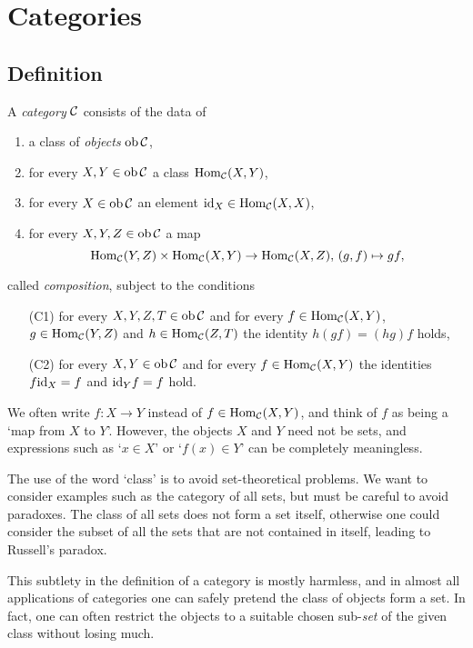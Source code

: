 
\chapter{Categories}
\label{chapter:categories}


\section{Definition}

\begin{definition}A \emph{category} ${\mathcal{C}}$ consists of the data of
\begin{enumerate}
\item a class of \emph{objects} $\operatorname{ob} {\mathcal{C}}$, 
\item for every $X,Y\in \operatorname{ob} {\mathcal{C}}$ a class $\operatorname{Hom}_{\mathcal{C}}(X,Y)$,
\item for every $X\in \operatorname{ob}{\mathcal{C}}$ an element ${\rm id}_X \in \operatorname{Hom}_{\mathcal{C}}(X,X)$,
\item for every $X,Y,Z \in \operatorname{ob} {\mathcal{C}}$ a map
\[
	  \operatorname{Hom}_{\mathcal{C}}(Y,Z) \times \operatorname{Hom}_{\mathcal{C}}(X,Y) \to \operatorname{Hom}_{\mathcal{C}}(X,Z),\,
	(g,f) \mapsto gf,
\]
\end{enumerate}
called \emph{composition}, subject to the conditions
\begin{enumerate}
\item[(C1)] for every $X,Y,Z,T \in \operatorname{ob} {\mathcal{C}}$ and for every $f \in \operatorname{Hom}_{\mathcal{C}}(X,Y)$, $g\in \operatorname{Hom}_{\mathcal{C}}(Y,Z)$ and $h \in \operatorname{Hom}_{\mathcal{C}}(Z,T)$ the identity $h(gf) = (hg)f$ holds,
\item[(C2)] for every $X,Y\in \operatorname{ob} {\mathcal{C}}$ and for every $f\in \operatorname{Hom}_{\mathcal{C}}(X,Y)$ the identities $f {\rm id}_X = f$ and ${\rm id}_Y f = f$ hold.
\end{enumerate}
\end{definition}

We often write $f\colon X\to Y$ instead of $f\in \operatorname{Hom}_{\mathcal{C}}(X,Y)$, and think of $f$ as being a `map from $X$ to $Y$'. However, the objects $X$ and $Y$ need not be sets, and expressions such as `$x\in X$' or `$f(x)\in Y$' can be completely meaningless. 

\begin{remark}
The use of the word `class' is to avoid set-theoretical problems. We want to consider examples such as the category of all sets, but must be careful to avoid paradoxes. The class of all sets does not form a set itself, otherwise one could consider the subset of all the sets that are not contained in itself, leading to Russell's paradox. 

This subtlety in the definition of a category is mostly harmless, and in almost all applications of categories one can safely pretend the class of objects form a set. In fact, one can often restrict the objects to a suitable chosen sub-\emph{set} of the given class without losing much.
\end{remark}

